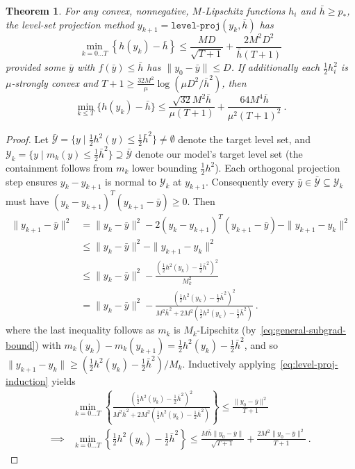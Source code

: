 \documentclass[sn-mathphys,Numbered]{sn-jnl}%
\newtheorem{theorem}{Theorem}%
\begin{document}
\begin{appendices}
{\begin{theorem}
    For any convex, nonnegative, $M$-Lipschitz functions $h_i$ and $\bar h \geq p_*$, the level-set projection method $y_{k+1}=\mathtt{level\mbox{-}proj}(y_k,\bar h)$  has
    $$ \min_{k=0\dots T}\left\{h(y_k) - \bar h\right\} \leq \frac{MD}{\sqrt{T+1}} + \frac{2M^2D^2}{\bar h(T+1)} $$
    provided some $\bar y$ with $f(\bar y)\leq \bar h$ has $\|y_0-\bar y\|\leq D$.
    If additionally each $\frac{1}{2}h_i^2$ is $\mu$-strongly convex and $T+1 \geq \frac{32M^2}{\mu}\log(\mu D^2/\bar h^2)$, then
    $$ \min_{k\leq T}\{h(y_k) - \bar h\} \leq \frac{\sqrt{32}M^2\bar h}{\mu (T+1)} + \frac{64M^4\bar h}{\mu^2(T+1)^2} \ . $$
\end{theorem}
\begin{proof}
Let $\mathcal{\bar Y} = \{y \mid \frac{1}{2}h^2(y) \leq \frac{1}{2}\bar h^2\}\neq\emptyset$ denote the target level set, and $\mathcal{Y}_k = \{y \mid m_k(y)\leq \frac{1}{2}\bar h^2\}\supseteq \mathcal{\bar Y}$ denote our model's target level set (the containment follows from $m_k$ lower bounding $\frac{1}{2}h^2$). Each orthogonal projection step ensures $y_{k}-y_{k+1}$ is normal to $\mathcal{Y}_k$ at $y_{k+1}$. Consequently every $\bar y\in \mathcal{\bar Y}\subseteq\mathcal{Y}_k$ must have $(y_k - y_{k+1})^T(y_{k+1}-\bar y)\geq 0$. Then
\begin{align}
    \|y_{k+1}-\bar y\|^2 &= \|y_k - \bar y\|^2  -  2(y_{k} - y_{k+1})^T(y_{k+1}-\bar y) - \|y_{k+1}-y_k\|^2 \nonumber \\
    &\leq \|y_k - \bar y\|^2 - \|y_{k+1}-y_k\|^2 \nonumber \\
    &\leq \|y_k - \bar y\|^2 - \frac{\left(\frac{1}{2}h^2(y_k) - \frac{1}{2}\bar h^2\right)^2}{M^2_k} \nonumber  \\
    &= \|y_k - \bar y\|^2 - \frac{\left(\frac{1}{2}h^2(y_k) - \frac{1}{2}\bar h^2\right)^2}{M^2\bar h^2 + 2M^2\left(\frac{1}{2}h^2(y_k) - \frac{1}{2}\bar h^2\right)} \ . \label{eq:level-proj-induction}
\end{align}
where the last inequality follows as $m_k$ is $M_k$-Lipschitz (by~\eqref{eq:general-subgrad-bound}) with $m_k(y_k)-m_k(y_{k+1}) = \frac{1}{2}h^2(y_k) - \frac{1}{2}\bar h^2$, and so $\|y_{k+1}-y_k\| \geq (\frac{1}{2}h^2(y_k) - \frac{1}{2}\bar h^2)/M_k$. Inductively applying~\eqref{eq:level-proj-induction} yields
\begin{align*}
    & \min_{k=0\dots T}\left\{\frac{\left(\frac{1}{2}h^2(y_k) - \frac{1}{2}\bar h^2\right)^2}{M^2\bar h^2 + 2M^2\left(\frac{1}{2}h^2(y_k) - \frac{1}{2}\bar h^2\right)}\right\} \leq \frac{\|y_0-\bar y\|^2}{T+1} \\
    \implies & \min_{k=0\dots T}\left\{\frac{1}{2}h^2(y_k) - \frac{1}{2}\bar h^2\right\} \leq \frac{M\bar h\|y_0-\bar y\|}{\sqrt{T+1}} + \frac{2M^2\|y_0-\bar y\|^2}{T+1} \ . 
\end{align*}


\end{proof}}
\end{appendices}
\end{document}
